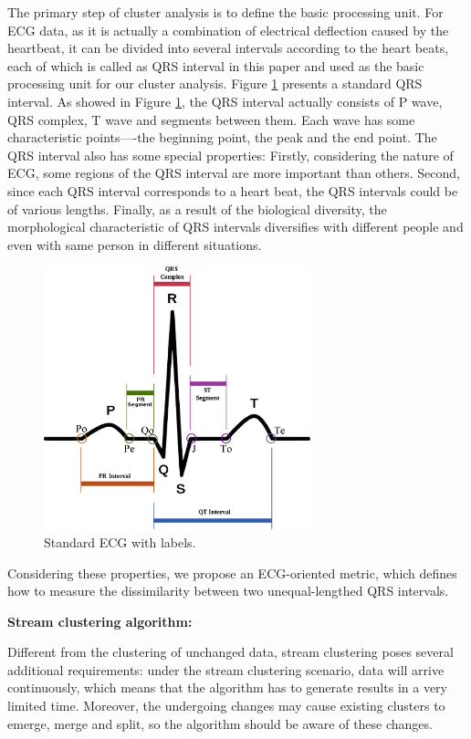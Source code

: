 \documentclass[conference]{IEEEtran}
\begin{document}
The primary step of cluster analysis is to define the basic processing unit. For ECG data, as it is actually a combination of electrical deflection caused by the heartbeat, it can be divided into several intervals according to the heart beats, each of which is called as QRS interval in this paper and used as the basic processing unit for our cluster analysis. Figure \ref{fig_ECG_lable} presents a standard QRS interval. As showed in Figure \ref{fig_ECG_lable}, the QRS interval actually consists of P wave, QRS complex, T wave and segments between them. Each wave has some characteristic points----the beginning point, the peak and the end point. The QRS interval also has some special properties: Firstly, considering the nature of ECG, some regions of the QRS interval are more important than others. Second, since each QRS interval corresponds to a heart beat, the QRS intervals could be of various lengths. Finally, as a result of the biological diversity, the morphological characteristic of QRS intervals diversifies with different people and even with same person in different situations.
\begin{figure}[!t]
\centering
\includegraphics[height=3.0in]{./Figure/rr_interval_label.eps}
\caption{Standard ECG with labels.}
\label{fig_ECG_lable}
\end{figure}


Considering these properties, we propose an ECG-oriented metric, which defines how to measure the dissimilarity between two unequal-lengthed QRS intervals.


\textbf{Stream clustering algorithm:}


Different from the clustering of unchanged data, stream clustering poses several additional requirements: under the stream clustering scenario, data will arrive continuously, which means that the algorithm has to generate results in a very limited time. Moreover, the undergoing changes may cause existing clusters to emerge, merge and split, so the algorithm should be aware of these changes.
\end{document}
